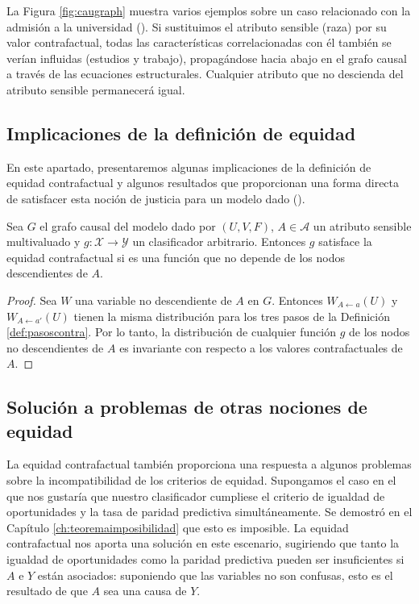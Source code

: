 \documentclass[oneside,openright,titlepage,numbers=noenddot,openany,headinclude,footinclude=true,
cleardoublepage=empty,abstractoff,BCOR=5mm,paper=a4,fontsize=12pt,main=spanish]{scrreprt}
\begin{document}
La Figura \ref{fig:caugraph} muestra varios ejemplos sobre un caso relacionado con la admisión a la universidad (\cite{worlds2017}). Si sustituimos el atributo sensible (raza) por su valor contrafactual, todas las características correlacionadas con él también se verían influidas (estudios y trabajo), propagándose hacia abajo en el grafo causal a través de las ecuaciones estructurales. Cualquier atributo que no descienda del atributo sensible permanecerá igual.

\subsection{Implicaciones de la definición de equidad}

En este apartado, presentaremos algunas implicaciones de la definición de equidad contrafactual y algunos resultados que proporcionan una forma directa de satisfacer esta noción de justicia para un modelo dado (\cite{counterfactual2018}).\\

\begin{lemma} \label{lem:nodescent}
Sea $G$ el grafo causal del modelo dado por $(U,V,F)$, $A\in \mathcal{A}$ un atributo sensible multivaluado y $g\colon \mathcal{X} \to \mathcal{Y}$ un clasificador arbitrario. Entonces $g$ satisface la equidad contrafactual si es una función que no depende de los nodos descendientes de $A$.
\end{lemma}

\begin{proof}
Sea $W$ una variable no descendiente de $A$ en $G$. Entonces $W_{A\leftarrow a}(U)$ y $W_{A\leftarrow a'}(U)$ tienen la misma distribución para los tres pasos de la Definición \ref{def:pasoscontra}. Por lo tanto, la distribución de cualquier función $g$ de los nodos no descendientes de $A$ es invariante con respecto a los valores contrafactuales de $A$.
\end{proof}

\subsection*{Solución a problemas de otras nociones de equidad}

La equidad contrafactual también proporciona una respuesta a algunos problemas sobre la incompatibilidad de los criterios de equidad. Supongamos el caso en el que nos gustaría que nuestro clasificador cumpliese el criterio de igualdad de oportunidades y la tasa de paridad predictiva simultáneamente. Se demostró en el Capítulo \ref{ch:teoremaimposibilidad} que esto es imposible. La equidad contrafactual nos aporta una solución en este escenario, sugiriendo que tanto la igualdad de oportunidades como la paridad predictiva pueden ser insuficientes si $A$ e $Y$ están asociados: suponiendo que las variables no son confusas, esto es el resultado de que $A$ sea una causa de $Y$. 
\end{document}
